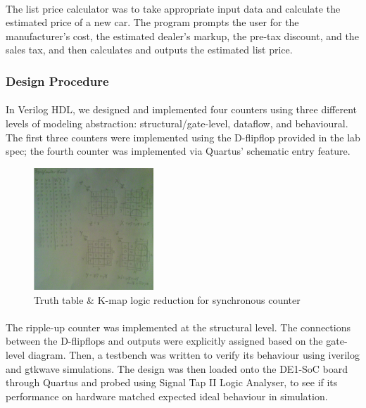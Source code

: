 \documentclass{article}
\begin{document}
	  	\paragraph{} The list price calculator was to take appropriate input data and calculate the estimated price of a new car. The program prompts the user for the manufacturer's cost, the estimated dealer's markup, the pre-tax discount, and the sales tax, and then calculates and outputs the estimated list price.

	  \subsubsection{Design Procedure}
	  	\paragraph{} In Verilog HDL, we designed and implemented four counters using three different levels of modeling abstraction: structural/gate-level, dataflow, and behavioural. The first three counters were implemented using the D-flipflop provided in the lab spec; the fourth counter was implemented via Quartus' schematic entry feature.
	  	

		  \begin{figure}
		  	\centering
		  	\includegraphics[width=0.4\textwidth]{figures/synch_k_maps.png}
		  	\caption{Truth table \& K-map logic reduction for synchronous counter}
		  	\label{fig:synCounter_kmap}
		  \end{figure}

		  \paragraph{}The ripple-up counter was implemented at the structural level. The connections between the D-flipflops and outputs were explicitly assigned based on the gate-level diagram. Then, a testbench was written to verify its behaviour using iverilog and gtkwave simulations. The design was then loaded onto the DE1-SoC board through Quartus and probed using Signal Tap II Logic Analyser, to see if its performance on hardware matched expected ideal behaviour in simulation.
\end{document}
